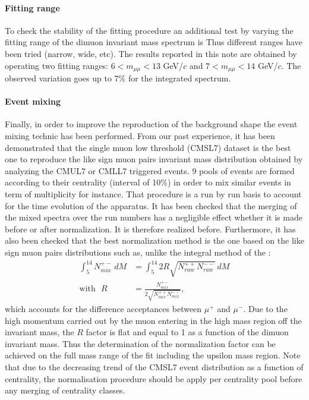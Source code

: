 \paragraph{Fitting range} 
To check the stability of the fitting procedure an additional test by varying the fitting range of the dimuon invariant mass spectrum is 
Thus different ranges have been tried (narrow, wide, etc).
The results reported in this note are obtained by operating two fitting ranges: $6<m_{\mu\mu}<13$ GeV/$c$ and $7<m_{\mu\mu}<14$ GeV/$c$.
The observed variation goes up to 7\% for the integrated spectrum.   

\paragraph{\label{mixing}Event mixing}
Finally, in order to improve the reproduction of the background shape the event mixing technic has been performed.
From our past experience, it has been demonstrated that the single muon low \pt threshold (CMSL7) dataset is the best one to reproduce the like sign muon pairs invariant mass distribution obtained by analyzing the CMUL7 or CMLL7 triggered events.
9 pools of events are formed according to their centrality (interval of 10\%) in order to mix similar events in term of multiplicity for instance.
That procedure is a run by run basis to account for the time evolution of the apparatus.
It has been checked that the merging of the mixed spectra over the run numbers has a negligible effect whether it is made before or after normalization.
It is therefore realized before. 
Furthermore, it has also been checked that the best normalization method is the one based on the like sign muon pairs distributions such as, unlike the integral method of the :
\begin{align*}
\int_{5}^{14}{ N^{+-}_{mix}\, dM}&=\int_{5}^{14}{ 2R\sqrt{N^{++}_{raw}N^{--}_{raw}}\, dM} \\
\text{with} \,\;\  R&=\frac{ N^{+-}_{mix} }{ 2\sqrt{N^{++}_{mix}N^{--}_{mix}} },
\end{align*} 
which accounts for the difference acceptances between $\mu^+$ and $\mu^-$.
Due to the high momentum carried out by the muon entering in the high mass region off the invariant mass, the $R$ factor is flat and equal to 1 as a function of the dimuon invariant mass.
Thus the determination of the normalization factor can be achieved on the full mass range of the fit including the upsilon mass region.
Note that due to the decreasing trend of the CMSL7 event distribution as a function of centrality, the normalisation procedure should be apply per centrality pool before any merging of centrality classes. 

